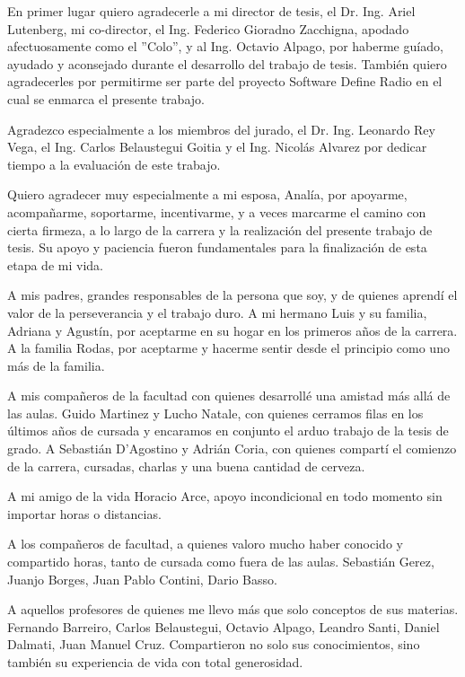 \documentclass[
11pt, %
spanish,
singlespacing, %
parskip, %
headsepline, %
]{MastersDoctoralThesis} %
\begin{document}
\begin{acknowledgements}
\vspace{1.5cm}

En primer lugar quiero agradecerle a mi director de tesis, el Dr. Ing. Ariel Lutenberg, mi
co-director, el Ing. Federico Gioradno Zacchigna, apodado afectuosamente como el ''Colo'', y al Ing.
Octavio Alpago, por haberme guíado, ayudado y aconsejado durante el desarrollo del trabajo de
tesis. También quiero agradecerles por permitirme ser parte del proyecto Software Define Radio en
el cual se enmarca el presente trabajo.

Agradezco especialmente a los miembros del jurado, el Dr. Ing. Leonardo Rey Vega, el Ing. Carlos
Belaustegui Goitia y el Ing. Nicolás Alvarez por dedicar tiempo a la evaluación de este trabajo.

Quiero agradecer muy especialmente a mi esposa, Analía, por apoyarme, acompañarme, soportarme,
incentivarme, y a veces marcarme el camino con cierta firmeza, a lo largo de la carrera y la
realización del presente trabajo de tesis. Su apoyo y paciencia fueron fundamentales para la
finalización de esta etapa de mi vida.

A mis padres, grandes responsables de la persona que soy, y de quienes aprendí el valor de la
perseverancia y el trabajo duro. A mi hermano Luis y su familia, Adriana y Agustín, por aceptarme
en su hogar en los primeros años de la carrera.\\
A la familia Rodas, por aceptarme y hacerme sentir desde el principio como uno más de la familia.

A mis compañeros de la facultad con quienes desarrollé una amistad más allá de las aulas. Guido
Martinez y Lucho Natale, con quienes cerramos filas en los últimos años de cursada y
encaramos en conjunto el arduo trabajo de la tesis de grado. A Sebastián D'Agostino y Adrián Coria,
con quienes compartí el comienzo de la carrera, cursadas, charlas y una
buena cantidad de cerveza.

A mi amigo de la vida Horacio Arce, apoyo incondicional en todo momento sin importar horas o
distancias.
 
A los compañeros de facultad, a quienes valoro mucho haber conocido y compartido horas, tanto de
cursada como fuera de las aulas. Sebastián Gerez, Juanjo Borges, Juan Pablo Contini, Dario Basso.

A aquellos profesores de quienes me llevo más que solo conceptos de sus materias. Fernando Barreiro,
Carlos Belaustegui, Octavio Alpago, Leandro Santi, Daniel Dalmati, Juan Manuel Cruz. Compartieron no
solo sus conocimientos, sino también su experiencia de vida con total generosidad.


\end{acknowledgements}
\end{document}
